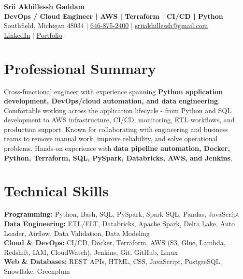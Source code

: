 \documentclass[letterpaper,10pt]{article}
\begin{document}
\fontsize{9.35pt}{10.45pt}\selectfont

\begin{center}
    {\LARGE \textbf{Srii Akhillessh Gaddam}} \\[-1pt]
    \textbf{DevOps / Cloud Engineer | AWS | Terraform | CI/CD | Python} \\[2pt]
    Southfield, Michigan 48034 $|$
    \href{tel:6468752400}{646-875-2400} $|$
    \href{mailto:sriiakhillessh@gmail.com}{sriiakhillessh@gmail.com} \\[1pt]
    \href{https://www.linkedin.com/in/srii-akhiilessh-gaddam-b48668191/}{LinkedIn} $|$
    \href{https://sriiakhillesshg.github.io/portfolio/}{Portfolio}
\end{center}
\vspace{-8pt}

\section{Professional Summary}
\small{Cross-functional engineer with experience spanning \textbf{Python application development, DevOps/cloud automation, and data engineering}. Comfortable working across the application lifecycle - from Python and SQL development to AWS infrastructure, CI/CD, monitoring, ETL workflows, and production support. Known for collaborating with engineering and business teams to remove manual work, improve reliability, and solve operational problems. Hands-on experience with \textbf{data pipeline automation, Docker, Python, Terraform, SQL, PySpark, Databricks, AWS, and Jenkins}.}

\section{Technical Skills}
\small{
\textbf{Programming:} Python, Bash, SQL, PySpark, Spark SQL, Pandas, JavaScript \\
\textbf{Data Engineering:} ETL/ELT, Databricks, Apache Spark, Delta Lake, Auto Loader, Airflow, Data Validation, Data Modeling \\
\textbf{Cloud \& DevOps:} CI/CD, Docker, Terraform, AWS (S3, Glue, Lambda, Redshift, IAM, CloudWatch), Jenkins, Git, GitHub, Linux \\
\textbf{Web \& Databases:} REST APIs, HTML, CSS, JavaScript, PostgreSQL, Snowflake, Greenplum
}
\end{document}
